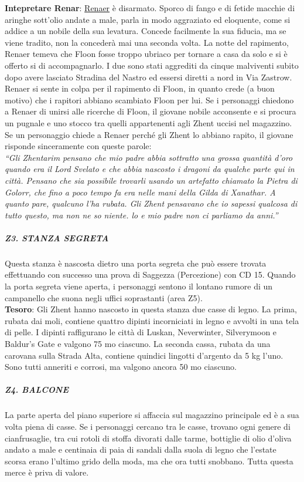 \documentclass{article}
\begin{document}
\textbf{Intepretare Renar}: \hyperlink{Reaner}{Renaer} è disarmato. Sporco di fango e di fetide macchie di
aringhe sott'olio andate a male, parla in modo aggraziato
ed eloquente, come si addice a un nobile della sua levatura.
Concede facilmente la sua fiducia, ma se viene tradito, non
la concederà mai una seconda volta.
La notte del rapimento, Renaer temeva che Floon fosse
troppo ubriaco per tornare a casa da solo e si è offerto si
di accompagnarlo. I due sono stati aggrediti da cinque
malviventi subito dopo avere lasciato Stradina del Nastro
ed essersi diretti a nord in Via Zastrow.
Renaer si sente in colpa per il rapimento di Floon,
in quanto crede (a buon motivo) che i rapitori abbiano scambiato Floon per lui. Se i personaggi chiedono a
Renaer di unirsi alle ricerche di Floon, il giovane nobile
acconsente e si procura un pugnale e uno stocco tra quelli
appartenenti agli Zhent uccisi nel magazzino.
Se un personaggio chiede a Renaer perché gli Zhent
lo abbiano rapito, il giovane risponde sinceramente con
queste parole: \\

\textit{“Gli Zhentarim pensano che mio padre abbia sottratto
una grossa quantità d'oro quando era il Lord Svelato
e che abbia nascosto i dragoni da qualche parte qui
in città. Pensano che sia possibile trovarli usando un
artefatto chiamato la Pietra di Golorr, che fino a poco
tempo fa era nelle mani della Gilda di Xanathar. A quanto
pare, qualcuno l'ha rubata. Gli Zhent pensavano che io
sapessi qualcosa di tutto questo, ma non ne so niente. lo
e mio padre non ci parliamo da anni.”}

\subparagraph{Z3. STANZA SEGRETA}
Questa stanza è nascosta dietro una porta segreta che
può essere trovata effettuando con successo una prova di
Saggezza (Percezione) con CD 15. Quando la porta segreta
viene aperta, i personaggi sentono il lontano rumore di un
campanello che suona negli uffici soprastanti (area Z5). \\

\textbf{Tesoro}: Gli Zhent hanno nascosto in questa stanza due casse di
legno. La prima, rubata dai moli, contiene quattro dipinti
incorniciati in legno e avvolti in una tela di pelle. I dipinti raffigurano le città di Luskan, Neverwinter, Silverymoon e
Baldur's Gate e valgono 75 mo ciascuno.
La seconda cassa, rubata da una carovana sulla Strada
Alta, contiene quindici lingotti d'argento da 5 kg l'uno. Sono
tutti anneriti e corrosi, ma valgono ancora 50 mo ciascuno.

\subparagraph{Z4. BALCONE}
La parte aperta del piano superiore si affaccia sul
magazzino principale ed è a sua volta piena di casse. Se
i personaggi cercano tra le casse, trovano ogni genere di
cianfrusaglie, tra cui rotoli di stoffa divorati dalle tarme,
bottiglie di olio d'oliva andato a male e centinaia di paia
di sandali dalla suola di legno che l'estate scorsa erano
l'ultimo grido della moda, ma che ora tutti snobbano. Tutta
questa merce è priva di valore.
\end{document}
